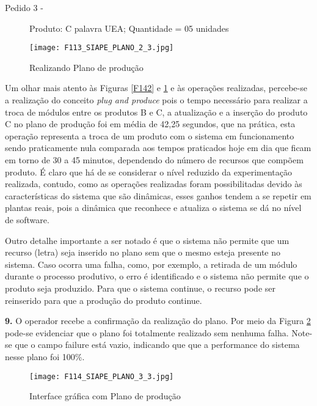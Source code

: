 		\begin{description}
			\item[Pedido 3 -] Produto: C  palavra UEA; Quantidade = 05 unidades
		\end{description} 
	
		\begin{figure}[!h]
			\centering
			\texttt{[image: F113\_SIAPE\_PLANO\_2\_3.jpg]} 
			\caption{Realizando Plano de produção}
			\label{F113}
		\end{figure}
		
		Um olhar mais atento às Figuras \ref{F142} e \ref{F113} e às operações realizadas, percebe-se a realização do conceito \textit{plug and produce} pois o tempo necessário para realizar a troca de módulos entre os produtos B e C, a atualização e a inserção do produto C no plano de produção foi em média de 42,25 segundos, que na prática, esta operação representa a troca de um produto com o sistema em funcionamento sendo praticamente nula comparada aos tempos praticados hoje em dia que ficam em torno de 30 a 45 minutos, dependendo do número de recursos que compõem  produto. É claro que há de se considerar o nível reduzido da experimentação realizada, contudo, como as operações realizadas foram possibilitadas devido às características do sistema que são dinâmicas, esses ganhos tendem a se repetir em plantas reais, pois a dinâmica que reconhece e atualiza o sistema se dá no nível de software.\par 
		Outro detalhe importante a ser notado é que o sistema não permite que um recurso (letra) seja inserido no plano sem que o mesmo esteja presente no sistema. Caso ocorra uma falha, como, por exemplo, a retirada de um módulo durante o processo produtivo, o erro é identificado e o sistema não permite que o produto seja produzido. Para que o sistema continue, o recurso pode ser reinserido para que a produção do produto continue.\par    
		
		
		\textbf{9.} O operador recebe a confirmação da realização do plano. Por meio da Figura \ref{F114} pode-se evidenciar que o plano foi totalmente realizado sem nenhuma falha. Note-se que o campo failure está vazio, indicando que que a performance do sistema nesse plano foi 100\%.
		
		
			\begin{figure}[!h]
				\centering
				\texttt{[image: F114\_SIAPE\_PLANO\_3\_3.jpg]} 
				\caption{Interface gráfica com Plano de produção}
				\label{F114}
			\end{figure}
		
